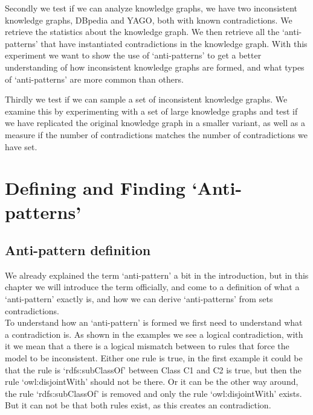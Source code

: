 \documentclass[11pt,letterpaper ,oneside ]{book}
\begin{document}
Secondly we test if we can analyze knowledge graphs, we have two inconsistent knowledge graphs, DBpedia and YAGO, both with known contradictions. We retrieve the statistics about the knowledge graph. We then retrieve all the `anti-patterns' that have instantiated contradictions in the knowledge graph. 
With this experiment we want to show the use of `anti-patterns' to get a better understanding of how inconsistent knowledge graphs are formed, and what types of `anti-patterns' are more common than others.

Thirdly we test if we can sample a set of inconsistent knowledge graphs. We examine this by experimenting with a set of large knowledge graphs and test if we have replicated the original knowledge graph in a smaller variant, as well as a measure if the number of contradictions matches the number of contradictions we have set.

\newpage
\chapter{Defining and Finding `Anti-patterns'}\label{Method}
\section{Anti-pattern definition}\label{AntiPatternDefinition}
We already explained the term  `anti-pattern' a bit in the introduction, but in this chapter we will introduce the term officially, and come to a definition of what a `anti-pattern' exactly is, and how we can derive `anti-patterns' from sets contradictions. \\

To understand how an `anti-pattern' is formed we first need to understand what a contradiction is. As shown in the examples we see a logical contradiction, with it we mean that a there is a logical mismatch between to rules that force the model to be inconsistent. Either one rule is true, in the first example it could be that the rule is `rdfs:subClassOf' between Class C1 and C2 is true, but then the rule `owl:disjointWith' should not be there. Or it can be the other way around, the rule `rdfs:subClassOf' is removed and only the rule `owl:disjointWith' exists. But it can not be that both rules exist, as this creates an contradiction. \\
\end{document}
